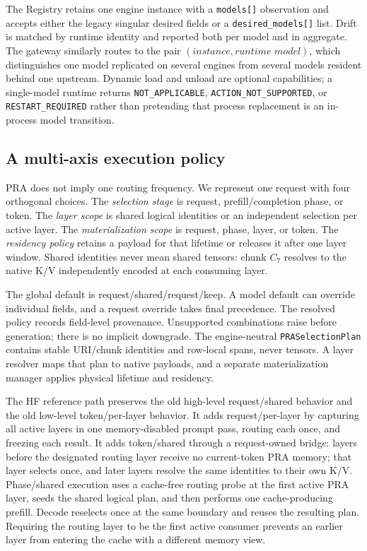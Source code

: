 \documentclass[11pt]{article}
\begin{document}
The Registry retains one engine instance with a \texttt{models[]} observation
and accepts either the legacy singular desired fields or a
\texttt{desired\_models[]} list. Drift is matched by runtime identity and
reported both per model and in aggregate. The gateway similarly routes to the
pair \((\textit{instance},\textit{runtime model})\), which distinguishes one
model replicated on several engines from several models resident behind one
upstream. Dynamic load and unload are optional capabilities; a single-model
runtime returns \texttt{NOT\_APPLICABLE}, \texttt{ACTION\_NOT\_SUPPORTED}, or
\texttt{RESTART\_REQUIRED} rather than pretending that process replacement is
an in-process model transition.

\subsection{A multi-axis execution policy}

PRA does not imply one routing frequency. We represent one request with four
orthogonal choices. The \emph{selection stage} is request, prefill/completion
phase, or token. The \emph{layer scope} is shared logical identities or an
independent selection per active layer. The \emph{materialization scope} is
request, phase, layer, or token. The \emph{residency policy} retains a payload
for that lifetime or releases it after one layer window. Shared identities never
mean shared tensors: chunk $C_7$ resolves to the native K/V independently
encoded at each consuming layer.

The global default is request/shared/request/keep. A model default can override
individual fields, and a request override takes final precedence. The resolved
policy records field-level provenance. Unsupported combinations raise before
generation; there is no implicit downgrade. The engine-neutral
\texttt{PRASelectionPlan} contains stable URI/chunk identities and row-local
spans, never tensors. A layer resolver maps that plan to native payloads, and a
separate materialization manager applies physical lifetime and residency.

The HF reference path preserves the old high-level request/shared behavior and
the old low-level token/per-layer behavior. It adds request/per-layer by
capturing all active layers in one memory-disabled prompt pass, routing each
once, and freezing each result. It adds token/shared through a request-owned
bridge: layers before the designated routing layer receive no current-token PRA
memory; that layer selects once, and later layers resolve the same identities
to their own K/V. Phase/shared execution uses a cache-free routing probe at the
first active PRA layer, seeds the shared logical plan, and then performs one
cache-producing prefill. Decode reselects once at the same boundary and reuses
the resulting plan. Requiring the routing layer to be the first active consumer
prevents an earlier layer from entering the cache with a different memory view.
\end{document}
